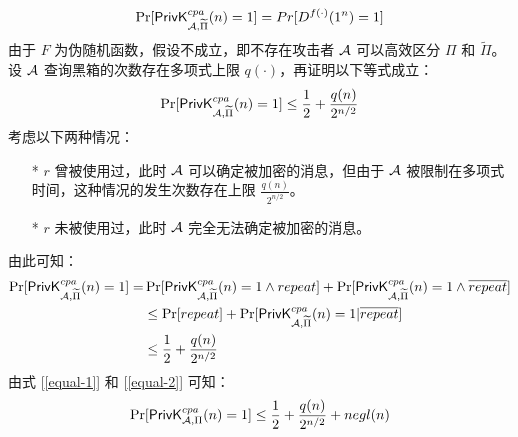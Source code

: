 \begin{questions}
\begin{solution}
\begin{equation}
\begin{aligned}
                \end{aligned}
            \end{equation}
            \begin{equation}
                \begin{aligned}
                   \Pr[\mathsf{PrivK}^{cpa}_{\mathcal{A},\widetilde{\Pi}}(n)=1]=Pr[D^{f(\cdot)}(1^n)=1]
                \end{aligned}
            \end{equation}
            由于 $F$ 为伪随机函数，假设不成立，即不存在攻击者 $\mathcal{A}$ 可以高效区分 $\Pi$ 和 $\widetilde{\Pi}$。设 $\mathcal{A}$ 查询黑箱的次数存在多项式上限 $q(\cdot)$，再证明以下等式成立：
            \begin{equation}
                \label{equal-2}
                \begin{aligned}
                   \Pr[\mathsf{PrivK}^{cpa}_{\mathcal{A},\widetilde{\Pi}}(n)=1]\leq\frac{1}{2}+\frac{q(n)}{2^{n/2}}
                \end{aligned}
            \end{equation}
            考虑以下两种情况：
            \begin{enumerate}
                \item[*] $r$ 曾被使用过，此时 $\mathcal{A}$ 可以确定被加密的消息，但由于 $\mathcal{A}$ 被限制在多项式时间，这种情况的发生次数存在上限 $\frac{q(n)}{2^{n/2}}$。
                \item[*] $r$ 未被使用过，此时 $\mathcal{A}$ 完全无法确定被加密的消息。
            \end{enumerate}
            由此可知：
            \begin{equation}
                \begin{aligned}
                   \Pr[\mathsf{PrivK}^{cpa}_{\mathcal{A},\widetilde{\Pi}}(n)=1]=&\Pr[\mathsf{PrivK}^{cpa}_{\mathcal{A},\widetilde{\Pi}}(n)=1\land{repeat}]+\Pr[\mathsf{PrivK}^{cpa}_{\mathcal{A},\widetilde{\Pi}}(n)=1\land\overline{repeat}]\\
                   &\leq\Pr[repeat]+\Pr[\mathsf{PrivK}^{cpa}_{\mathcal{A},\widetilde{\Pi}}(n)=1|\overline{repeat}]\\
                   &\leq\frac{1}{2}+\frac{q(n)}{2^{n/2}}
                \end{aligned}
            \end{equation}
            由式 [\ref{equal-1}] 和 [\ref{equal-2}] 可知：
            \begin{equation}
                \begin{aligned}
                   \Pr[\algo{PrivK}^{cpa}_{\AdvA,\Pi}(n)=1]\leq\frac{1}{2}+\frac{q(n)}{2^{n/2}}+negl(n)

\end{aligned}
\end{equation}
\end{solution}
\end{questions}
